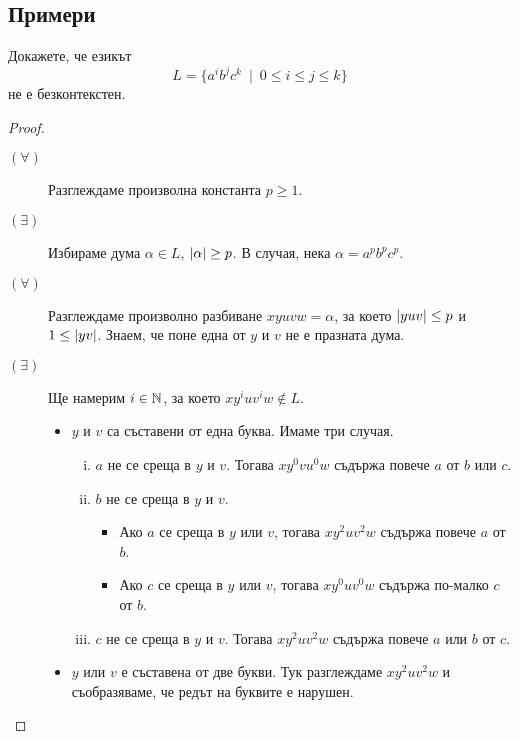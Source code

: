 \subsection{Примери}

\begin{problem}
  Докажете, че езикът
  \[L = \{a^ib^jc^k\ \mid\ 0 \leq i \leq j \leq k\}\]
  не е безконтекстен.
\end{problem}
\begin{proof}
  \begin{description}
  \item[$(\forall)$]
     Разглеждаме произволна константа $p \geq 1$.
   \item[$(\exists)$]
     Избираме дума $\alpha \in L$, $\vert{\alpha}\vert \geq p$.
     В случая, нека $\alpha = a^pb^pc^p$.
   \item[$(\forall)$]
     Разглеждаме произволно разбиване $xyuvw = \alpha$, за което $\vert{yuv}\vert \leq p$ и $1 \leq \vert{yv}\vert$.
     Знаем, че поне една от $y$ и $v$ не е празната дума.
   \item[$(\exists)$] Ще намерим $i \in \mathbb{N}$, за което $xy^iuv^iw \not\in L$.
    \begin{itemize}
    \item
      $y$ и $v$ са съставени от една буква.
      Имаме три случая.
      \begin{enumerate}[i)]
      \item
        $a$ не се среща в $y$ и $v$.
        Тогава $xy^0vu^0w$ съдържа повече $a$ от $b$ или $c$.
      \item
        $b$ не се среща в $y$ и $v$.
        \begin{itemize}
        \item 
          Ако $a$ се среща в $y$ или $v$, тогава $xy^2uv^2w$ съдържа повече $a$ от $b$.
        \item
          Ако $c$ се среща в $y$ или $v$, тогава $xy^0uv^0w$ съдържа по-малко $c$ от $b$.
        \end{itemize}
      \item
        $c$ не се среща в $y$ и $v$.
        Тогава $xy^2uv^2w$ съдържа повече $a$ или $b$ от $c$.
      \end{enumerate}      
     \item
       $y$ или $v$ е съставена от две букви.
       Тук разглеждаме $xy^2uv^2w$ и съобразяваме, че редът на буквите е нарушен.
     \end{itemize}    
   \end{description}
\end{proof}

